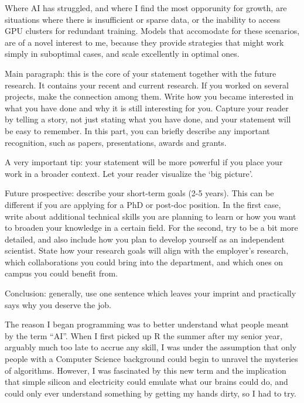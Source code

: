 \documentclass[11pt, a4paper]{awesome-cv}
\begin{document}
\begin{cvletter}
Where AI has struggled, and where I find the most opporunity for growth, are situations where there is insufficient or sparse data, or the inability to access GPU clusters for redundant training. Models that accomodate for these scenarios, are of a novel interest to me, because they provide strategies that might work simply in suboptimal cases, and scale excellently in optimal ones.




Main paragraph: this is the core of your statement together with the future research. It contains your recent and current research. If you worked on several projects, make the connection among them. Write how you became interested in what you have done and why it is still interesting for you. Capture your reader by telling a story, not just stating what you have done, and your statement will be easy to remember. In this part, you can briefly describe any important recognition, such as papers, presentations, awards and grants.

A very important tip: your statement will be more powerful if you place your work in a broader context. Let your reader visualize the ‘big picture’.

Future prospective: describe your short-term goals (2-5 years). This can be
different if you are applying for a PhD or post-doc position. In the first case,
write about additional technical skills you are planning to learn or how you
want to broaden your knowledge in a certain field. For the second, try to be a
bit more detailed, and also include how you plan to develop yourself as an
independent scientist. State how your research goals will align with the
employer’s research, which collaborations you could bring into the department,
and which ones on campus you could benefit from.

Conclusion: generally, use one sentence which leaves your imprint and practically says why you deserve the job.




The reason I began programming was to better understand what people meant by
the term ``AI''. When I first picked up R the summer after my senior year, arguably much too
late to accrue any skill, I was under the assumption that only people with a
Computer Science background could begin to unravel the mysteries of algorithms.
However, I was fascinated by this new term and the implication that simple
silicon and electricity could emulate what our brains could do, and could only ever understand
something by getting my hands dirty, so I had to try.


\end{cvletter}
\end{document}
